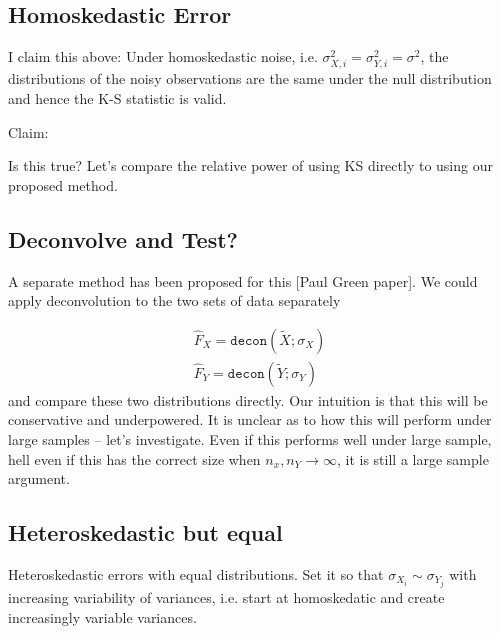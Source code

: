 \documentclass[12pt]{article}
\newcommand{\Xtilde}{\tilde{X}}
\newcommand{\Ytilde}{\tilde{Y}}
\newcommand{\decon}{\mathtt{decon}}
\newcommand{\Fhat}{\hat{F}}
\begin{document}
\subsection{Homoskedastic Error} %
\label{sub:homoskedastic_error}

I claim this above:
Under homoskedastic noise, i.e. $\sigma^2_{X,i} = \sigma^2_{Y,i} = \sigma^2$, the distributions of the noisy observations are the same under the null distribution and hence the K-S statistic is valid. 

Claim:  

Is this true? Let's compare the relative power of using KS directly to using our proposed method.


\subsection{Deconvolve and Test?} %
\label{sub:deconvolve_and_test}

A separate method has been proposed for this [Paul Green paper]. We could apply deconvolution to the two sets of data separately 

\begin{align*}
	\Fhat_X = \decon(\Xtilde; \sigma_X)\\
	\Fhat_Y = \decon(\Ytilde; \sigma_Y)
\end{align*}
 and compare these two distributions directly. Our intuition is that this will be conservative and underpowered. It is unclear as to how this will perform under large samples -- let's investigate. Even if this performs well under large sample, hell even if this has the correct size when $n_x, n_Y \rightarrow \infty$, it is still a large sample argument. 


\subsection{Heteroskedastic but equal} %
\label{sub:heteroskedastic_but_equal}

Heteroskedastic errors with equal distributions. Set it so that $\sigma_{X_i} \sim \sigma_{Y_j}$ with increasing variability of variances, i.e. start at homoskedatic and create increasingly variable variances. 




\end{document}
